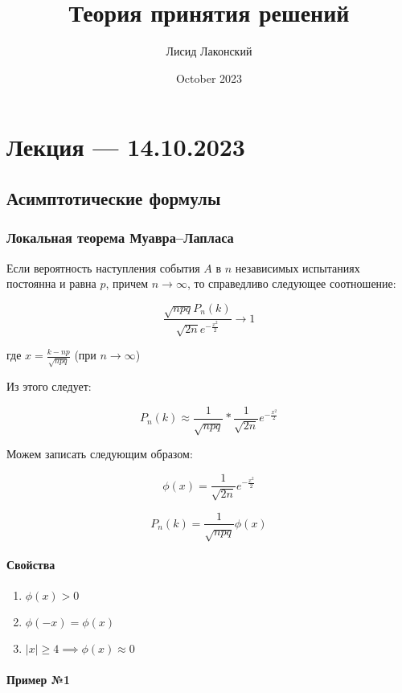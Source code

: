 \documentclass{article}
\title{Теория принятия решений}
\author{Лисид Лаконский}
\date{October 2023}
\begin{document}
\raggedright

\maketitle

\tableofcontents
\pagebreak

\section{Лекция — 14.10.2023}

\subsection{Асимптотические формулы}

\subsubsection{Локальная теорема Муавра–Лапласа}

Если вероятность наступления события $A$ в $n$ независимых испытаниях постоянна и равна $p$, причем $n \rightarrow \infty$, то справедливо следующее соотношение:

$$
\frac{\sqrt{n p q} P_n (k)}{\sqrt{2 n} e^{-\frac{x^2}{2}}} \rightarrow 1
$$

где $x = \frac{k - n p}{\sqrt{n p q}}$ (при $n \to \infty$)

Из этого следует:

$$
P_{n}(k) \approx \frac{1}{\sqrt{n p q}} * \frac{1}{\sqrt{2 n}} e^{-\frac{x^2}{2}}
$$

Можем записать следующим образом:

$$\phi(x) = \frac{1}{\sqrt{2 n}} e^{-\frac{x^2}{2}}$$

$$P_n(k) = \frac{1}{\sqrt{npq}} \phi(x)$$

\paragraph{Свойства}

\begin{enumerate}
    \item $\phi(x) > 0$
    \item $\phi(-x) = \phi(x)$
    \item $|x| \ge 4 \implies \phi(x) \approx 0$
\end{enumerate}

\paragraph{Пример №1}
\end{document}
